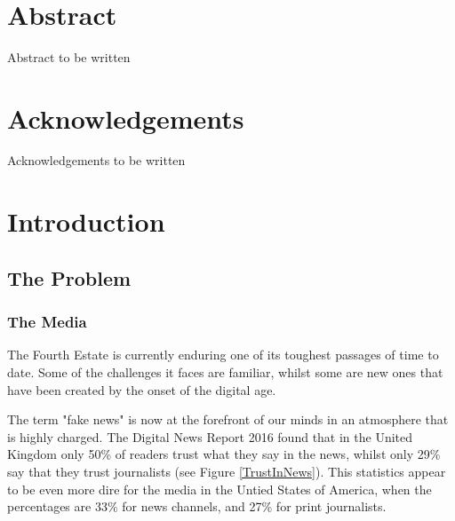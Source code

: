 \documentclass[12pt]{article}
\makeatletter
\let\thedate\@date
\makeatother
\begin{document}
\begin{titlepage}
	{\large \thedate}\\[2 cm]
 
	\vfill
	
\end{titlepage}


\section*{Abstract}
Abstract to be written

\pagebreak

\section*{Acknowledgements}

Acknowledgements to be written

\clearpage

\doublespacing
\tableofcontents
\pagebreak
\listoffigures
\pagebreak
\listoftables
\pagebreak
\lstlistoflistings
\singlespacing
\pagebreak



\section{Introduction}

\subsection{The Problem}

\subsubsection{The Media}

The Fourth Estate is currently enduring one of its toughest passages of time to date. Some of the challenges it faces are familiar, whilst some are new ones that have been created by the onset of the digital age. 

The term "fake news" is now at the forefront of our minds in an atmosphere that is highly charged. The Digital News Report 2016 found that in the United Kingdom only 50\% of readers trust what they say in the news, whilst only 29\% say that they trust journalists (see Figure \ref{TrustInNews}). This statistics appear to be even more dire for the media in the Untied States of America, when the percentages are 33\% for news channels, and 27\% for print journalists.
\end{document}
